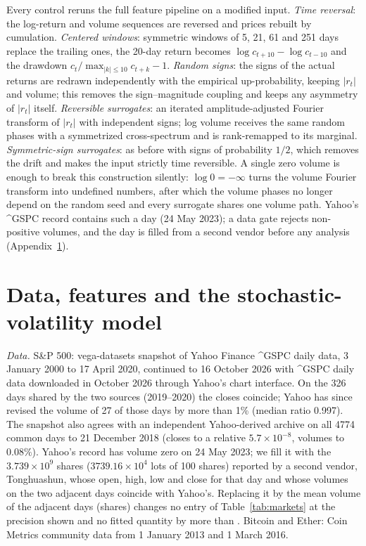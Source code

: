 Every control reruns the full feature pipeline on a modified input. \emph{Time reversal}: the log-return and volume sequences are reversed and prices rebuilt by cumulation. \emph{Centered windows}: symmetric windows of 5, 21, 61 and 251 days replace the trailing ones, the 20-day return becomes $\log c_{t+10}-\log c_{t-10}$ and the drawdown $c_t/\max_{|k|\le10}c_{t+k}-1$. \emph{Random signs}: the signs of the actual returns are redrawn independently with the empirical up-probability, keeping $|r_t|$ and volume; this removes the sign--magnitude coupling and keeps any asymmetry of $|r_t|$ itself. \emph{Reversible surrogates}: an iterated amplitude-adjusted Fourier transform \cite{schreiber1996} of $|r_t|$ with independent signs; log volume receives the same random phases with a symmetrized cross-spectrum and is rank-remapped to its marginal. \emph{Symmetric-sign surrogates}: as before with signs of probability $1/2$, which removes the drift and makes the input strictly time reversible. A single zero volume is enough to break this construction silently: $\log 0=-\infty$ turns the volume Fourier transform into undefined numbers, after which the volume phases no longer depend on the random seed and every surrogate shares one volume path. Yahoo's \textasciicircum{}GSPC record contains such a day (24 May 2023); a data gate rejects non-positive volumes, and the day is filled from a second vendor before any analysis (Appendix~\ref{app:data}).

\section{Data, features and the stochastic-volatility model}\label{app:data}

\emph{Data.} S\&P 500: vega-datasets snapshot of Yahoo Finance \textasciicircum{}GSPC daily data, 3 January 2000 to 17 April 2020, continued to 16 October 2026 with \textasciicircum{}GSPC daily data downloaded in October 2026 through Yahoo's chart interface. On the 326 days shared by the two sources (2019--2020) the closes coincide; Yahoo has since revised the volume of 27 of those days by more than 1\% (median ratio 0.997). The snapshot also agrees with an independent Yahoo-derived archive \cite{vijinho} on all 4774 common days to 21 December 2018 (closes to a relative $5.7\times10^{-8}$, volumes to $0.08\%$). Yahoo's record has volume zero on 24 May 2023; we fill it with the $3.739\times10^9$ shares ($3739.16\times10^4$ lots of 100 shares) reported by a second vendor, Tonghuashun, whose open, high, low and close for that day and whose volumes on the two adjacent days coincide with Yahoo's. Replacing it by the mean volume of the adjacent days (\VolAdj shares) changes no entry of Table~\ref{tab:markets} at the precision shown and no fitted quantity by more than \VolMaxDiff. Bitcoin and Ether: Coin Metrics community data from 1 January 2013 and 1 March 2016.

